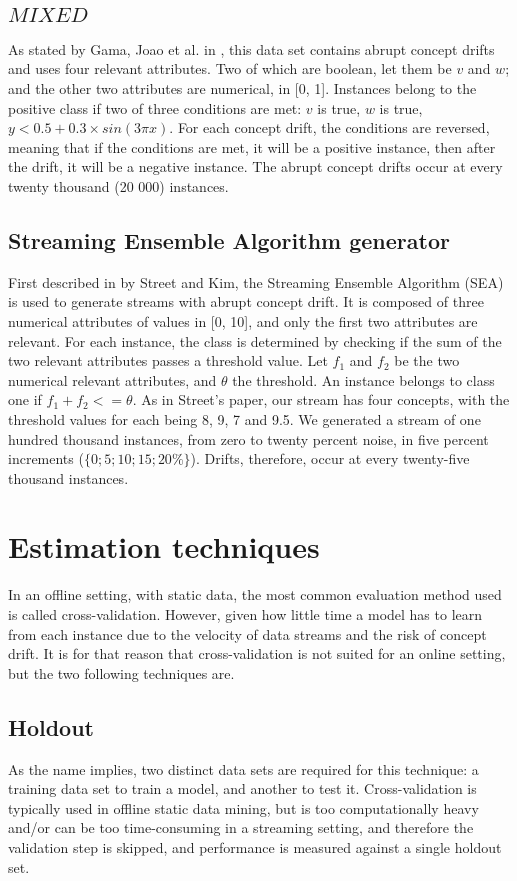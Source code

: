 \subsection{$MIXED$}
As stated by Gama, Joao et al. in \cite{gama2004learning}, this data set contains abrupt concept drifts and uses four relevant attributes. Two of which are boolean, let them be $v$ and $w$; and the other two attributes are numerical, in [0, 1]. Instances belong to the positive class if two of three conditions are met: $v$ is true, $w$ is true, $y < 0.5 + 0.3 \times sin(3\pi x)$. For each concept drift, the conditions are reversed, meaning that if the conditions are met, it will be a positive instance, then after the drift, it will be a negative instance. The abrupt concept drifts occur at every twenty thousand (20 000) instances.

\subsection{Streaming Ensemble Algorithm generator}
First described in \cite{street2001streaming} by Street and Kim, the Streaming Ensemble Algorithm (SEA) is used to generate streams with abrupt concept drift. It is composed of three numerical attributes of values in [0, 10], and only the first two attributes are relevant. For each instance, the class is determined by checking if the sum of the two relevant attributes passes a threshold value. Let $f_1$ and $f_2$ be the two numerical relevant attributes, and $\theta$ the threshold. An instance belongs to class one if $f_1 + f_2 <= \theta$. As in Street's paper, our stream has four concepts, with the threshold values for each being 8, 9, 7 and 9.5. We generated a stream of one hundred thousand instances, from zero to twenty percent noise, in five percent increments ($\{0; 5; 10; 15; 20\%\}$). Drifts, therefore, occur at every twenty-five thousand instances.

\section{Estimation techniques}
In an offline setting, with static data, the most common evaluation method used is called cross-validation. However, given how little time a model has to learn from each instance due to the velocity of data streams and the risk of concept drift. It is for that reason that cross-validation is not suited for an online setting, but the two following techniques are.

\subsection{Holdout}
As the name implies, two distinct data sets are required for this technique: a training data set to train a model, and another to test it.  Cross-validation is typically used in offline static data mining, but is too computationally heavy and/or can be too time-consuming in a streaming setting, and therefore the validation step is skipped, and performance is measured against a single holdout set.\cite{bifet2009data}
 
